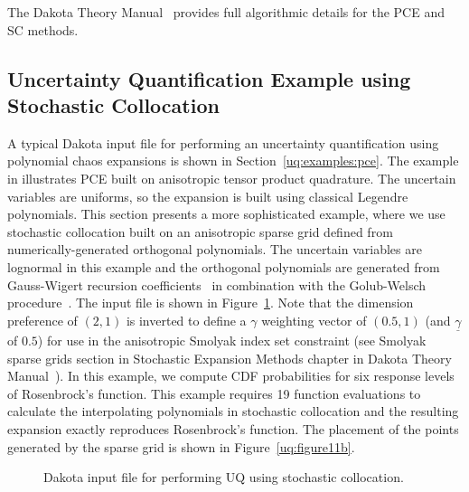 The Dakota Theory Manual~\cite{TheoMan} provides full algorithmic
details for the PCE and SC methods.


\subsection{Uncertainty Quantification Example using Stochastic Collocation}\label{uq:uncertainty2}

A typical Dakota input file for performing an uncertainty
quantification using polynomial chaos expansions is shown in 
Section~\ref{uq:examples:pce}. The example
in illustrates PCE built on anisotropic tensor
product quadrature. The uncertain variables are uniforms, so the
expansion is built using classical Legendre polynomials. This section
presents a more sophisticated example, where we use stochastic
collocation built on an anisotropic sparse grid defined from
numerically-generated orthogonal polynomials. The uncertain variables
are lognormal in this example and the orthogonal polynomials are
generated from Gauss-Wigert recursion coefficients~\cite{simpson_gw}
in combination with the Golub-Welsch procedure~\cite{GolubWelsch69}.
The input file is shown in Figure~\ref{uq:figure11}. 
Note that the dimension preference of $(2,1)$ is inverted
to define a $\gamma$ weighting vector of $(0.5,1)$ (and
$\underline{\gamma}$ of $0.5$) for use in the anisotropic Smolyak
index set constraint (see Smolyak sparse grids section in Stochastic
Expansion Methods chapter in Dakota Theory Manual~\cite{TheoMan}). In
this example, we compute CDF probabilities for six response levels of
Rosenbrock's function. This example requires 19 function evaluations
to calculate the interpolating polynomials in stochastic collocation
and the resulting expansion exactly reproduces Rosenbrock's function.
The placement of the points generated by the sparse grid is shown in
Figure~\ref{uq:figure11b}.

\begin{figure}
  \centering
  \begin{bigbox}
    \begin{small}
    \end{small}
  \end{bigbox}
\caption{Dakota input file for performing UQ using stochastic collocation.}
\label{uq:figure11}
\end{figure}

